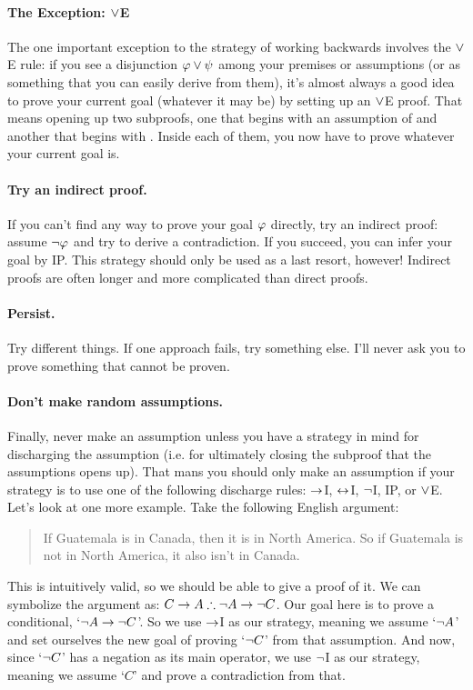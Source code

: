 \paragraph{The Exception: $\vee$E}
The one important exception to the strategy of working backwards involves the $\vee$E rule: if you see a disjunction $\mathcal{\varphi} \vee \mathcal{\psi}$ among your premises or assumptions (or as something that you can easily derive from them), it's almost always a good idea to prove your current goal (whatever it may be) by setting up an $\vee$E proof.  That means opening up two subproofs, one that begins with an assumption of \meta{\varphi} and another that begins with \meta{\psi}.  Inside each of them, you now have to prove whatever your current goal is.



\paragraph{Try an indirect proof.}
If you can't find any way to prove your goal $\mathcal{\varphi}$ directly, try an indirect proof: assume $\neg \mathcal{\varphi}$ and try to derive a contradiction.  If you succeed, you can infer your goal \meta{\varphi} by IP.  This strategy should only be used as a last resort, however!  Indirect proofs are often longer and more complicated than direct proofs.

\paragraph{Persist.}
Try different things. If one approach fails, try something else.  I'll never ask you to prove something that cannot be proven.

\paragraph{Don't make random assumptions.} Finally, never make an assumption unless you have a strategy in mind for discharging the assumption (i.e. for ultimately closing the subproof that the assumptions opens up).  That mans you should only make an assumption if your strategy is to use one of the following discharge rules: $\rightarrow$I, $\leftrightarrow$I, $\neg$I, IP, or $\vee$E.\\


Let's look at one more example.  Take the following English argument:
\begin{quote}
If Guatemala is in Canada, then it is in North America. So if Guatemala is not in North America, it also isn't in Canada.
\end{quote}
This is intuitively valid, so we should be able to give a proof of it.  We can symbolize the argument as: $C \rightarrow A \therefore \neg A \rightarrow \neg C$.	Our goal here is to prove a conditional, `$\neg A \rightarrow \neg C$'.  So we use $\rightarrow$I as our strategy, meaning we assume `$\neg A$' and set ourselves the new goal of proving `$\neg C$' from that assumption.  And now, since `$\neg C$' has a negation as its main operator, we use $\neg$I as our strategy, meaning we assume `$C$' and prove a contradiction from that.


